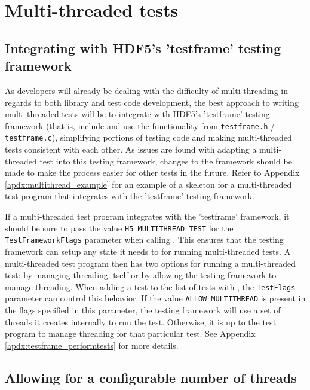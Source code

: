 \documentclass[../HDF5_RFC.tex]{subfiles}
\begin{document}
\section{Multi-threaded tests}
\label{multithread}

\subsection{Integrating with HDF5's 'testframe' testing framework}

As developers will already be dealing with the difficulty of multi-threading in regards to both library
and test code development, the best approach to writing multi-threaded tests will be to integrate with
HDF5's 'testframe' testing framework (that is, include and use the functionality from \texttt{testframe.h} / \texttt{testframe.c}), simplifying portions of testing code and making multi-threaded tests consistent
with each other. As issues are found with adapting a multi-threaded test into this testing framework,
changes to the framework should be made to make the process easier for other tests in the future. Refer
to Appendix \ref{apdx:multithread_example} for an example of a skeleton for a multi-threaded test program
that integrates with the 'testframe' testing framework.

If a multi-threaded test program integrates with the 'testframe' framework, it should be sure to pass
the value \texttt{H5\_MULTITHREAD\_TEST} for the \texttt{TestFrameworkFlags} parameter when calling
. This ensures that the testing framework can setup any state it needs
to for running multi-threaded tests. A multi-threaded test program then has two options for running
a multi-threaded test: by managing threading itself or by allowing the testing framework to manage
threading. When adding a test to the list of tests with , the
\texttt{TestFlags} parameter can control this behavior. If the value \texttt{ALLOW\_MULTITHREAD} is
present in the flags specified in this parameter, the testing framework will use a set of threads it
creates internally to run the test. Otherwise, it is up to the test program to manage threading for
that particular test. See Appendix \ref{apdx:testframe_performtests} for more details.

\subsection{Allowing for a configurable number of threads}
\end{document}
